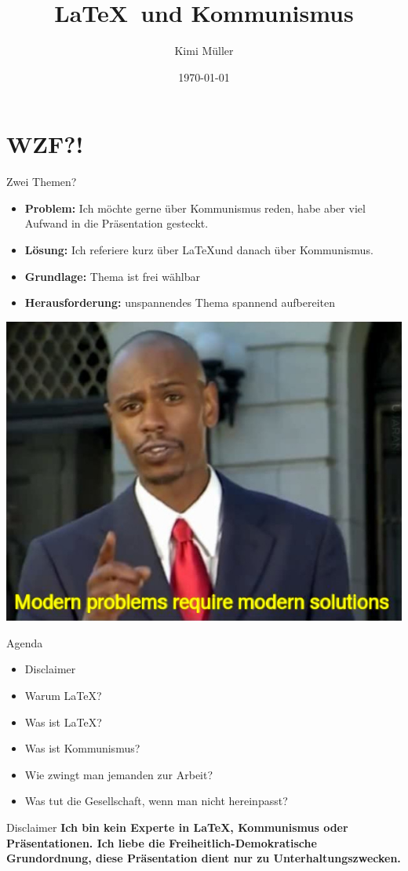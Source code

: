 \documentclass{beamer}
\title{\LaTeX \  und Kommunismus}
\date{\today}
\author{Kimi Müller}
\begin{document}
  \maketitle
  \section{WZF?!}
  \begin{frame}{Zwei Themen?}
    \begin{itemize}
        \item<1-> \textbf{Problem:} Ich möchte gerne über Kommunismus reden, habe aber viel Aufwand in die Präsentation gesteckt.
        \item<2-> \textbf{Lösung:} Ich referiere kurz über \LaTeX und danach über Kommunismus.
        \item<3-> \textbf{Grundlage:} Thema ist frei wählbar
        \item<4-> \textbf{Herausforderung:} unspannendes Thema spannend aufbereiten
    \end{itemize}
  \end{frame}
  \begin{frame}
    \includegraphics[width=\textwidth]{Modern_Problems_Require_Modern_Solutions.jpg}
  \end{frame}
  \begin{frame}{Agenda}
\begin{itemize}
    \item Disclaimer
    \item Warum \LaTeX?
    \item Was ist \LaTeX?
    \item Was ist Kommunismus?
    \item Wie zwingt man jemanden zur Arbeit?
    \item Was tut die Gesellschaft, wenn man nicht hereinpasst?
\end{itemize}
  \end{frame}
  \begin{frame}{Disclaimer}
\textbf{Ich bin kein Experte in \LaTeX, Kommunismus oder Präsentationen. Ich liebe die Freiheitlich-Demokratische Grundordnung, diese Präsentation dient nur zu Unterhaltungszwecken.}
\end{frame}
\end{document}

